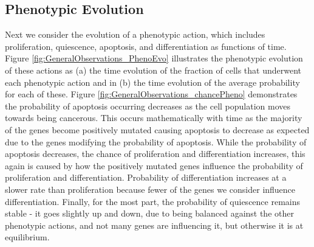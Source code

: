 \documentclass[\main/thesis.tex]{subfiles}
\begin{document}
\subsection{Phenotypic Evolution}
Next we consider the evolution of a phenotypic action, which includes proliferation, quiescence, apoptosis, and differentiation as functions of time. 
Figure \ref{fig:GeneralObservations_PhenoEvo} illustrates the phenotypic evolution of these actions as (a) the time evolution of the fraction of cells that underwent each phenotypic action and in (b) the time evolution of the average probability for each of these. Figure \ref{fig:GeneralObservations_chancePheno} demonstrates the probability of apoptosis occurring decreases as the cell population moves towards being cancerous. This occurs mathematically with time as the majority of the genes become positively mutated causing apoptosis to decrease as expected due to the genes modifying the probability of apoptosis. While the probability of apoptosis decreases, the chance of proliferation and differentiation increases, this again is caused by how the positively mutated genes influence the probability of proliferation and differentiation. Probability of differentiation increases at a slower rate than proliferation because fewer of the genes we consider influence differentiation. Finally, for the most part, the probability of quiescence remains stable - it goes slightly up and down, due to being balanced against the other phenotypic actions, and not many genes are influencing it, but otherwise it is at equilibrium.
\end{document}
